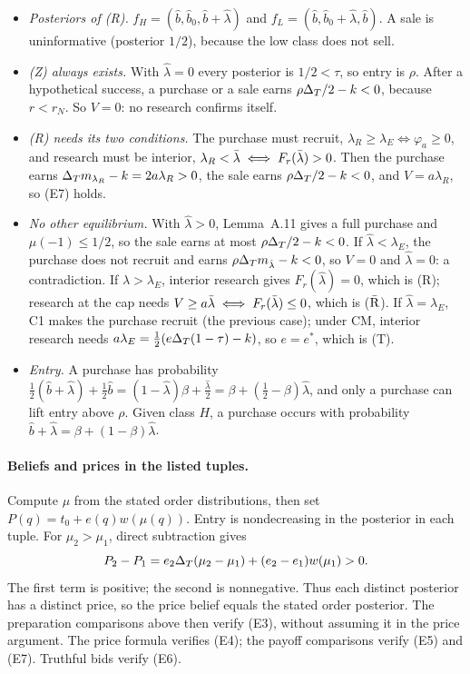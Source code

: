\begin{itemize}[leftmargin=2em]
\item \emph{Posteriors of (R).} \(f_H=(\hat b,\hat b_0,\hat b+\hat\lambda)\) and \(f_L=(\hat b,\hat b_0+\hat\lambda,\hat b)\). A sale is
uninformative (posterior \(1/2\)), because the low class does not sell.
\item \emph{(Z) always exists.} With \(\hat\lambda=0\) every posterior is \(1/2<\tau\), so entry is \(\rho\). After a
hypothetical success, a purchase or a sale earns \(\rho\Delta_T/2-k<0\), because \(r<r_N\). So \(V=0\): no research confirms
itself.
\item \emph{(R) needs its two conditions.} The purchase must recruit, \(\lambda_R\ge\lambda_E\iff\varphi_a\ge0\), and research
must be interior, \(\lambda_R<\bar\lambda\iff F_r(\bar\lambda)>0\). Then the purchase earns \(\Delta_T m_{\lambda_R}-k=2a\lambda_R>0\), the sale
earns \(\rho\Delta_T/2-k<0\), and \(V=a\lambda_R\), so (E7) holds.
\item \emph{No other equilibrium.} With \(\hat\lambda>0\), Lemma~A.11 gives a full purchase and \(\mu(-1)\le1/2\), so the sale
earns at most \(\rho\Delta_T/2-k<0\). If \(\hat\lambda<\lambda_E\), the purchase does not recruit and earns
\(\rho\Delta_T m_{\hat\lambda}-k<0\), so \(V=0\) and \(\hat\lambda=0\): a contradiction. If \(\hat\lambda>\lambda_E\), interior research
gives \(F_r(\hat\lambda)=0\), which is (R); research at the cap needs \(V\ge a\bar\lambda\iff F_r(\bar\lambda)\le0\), which is
(\(\bar{\rm R}\)). If \(\hat\lambda=\lambda_E\), C1 makes the purchase recruit (the previous case); under CM, interior research
needs \(a\lambda_E=\tfrac12(e\Delta_T(1-\tau)-k)\), so \(e=e^*\), which is (T).
\item \emph{Entry.} A purchase has probability
\(\tfrac12(\hat b+\hat\lambda)+\tfrac12\hat b=(1-\hat\lambda)\beta+\tfrac{\hat\lambda}2=\beta+(\tfrac12-\beta)\hat\lambda\), and only
a purchase can lift entry above \(\rho\). Given class \(H\), a purchase occurs with probability \(\hat b+\hat\lambda=\beta+(1-\beta)\hat\lambda\).
\end{itemize}

\paragraph{Beliefs and prices in the listed tuples.}
Compute \(\mu\) from the stated order distributions, then set \(P(q)=t_0+e(q)w(\mu(q))\).
Entry is nondecreasing in the posterior in each tuple.
For \(\mu_2>\mu_1\), direct subtraction gives
\[
P_2-P_1=e_2\Delta_T(\mu_2-\mu_1)+(e_2-e_1)w(\mu_1)>0.
\]
The first term is positive; the second is nonnegative.
Thus each distinct posterior has a distinct price, so the price belief equals the stated order posterior.
The preparation comparisons above then verify (E3), without assuming it in the price argument.
The price formula verifies (E4); the payoff comparisons verify (E5) and (E7).
Truthful bids verify (E6).

